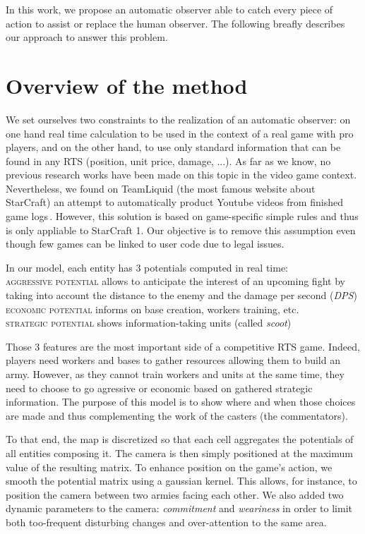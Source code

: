 \documentclass{jfsma}
\begin{document}
    In this work, we propose an automatic observer able to catch every piece of action to assist or replace the human observer. The following breafly describes our approach to answer this problem.

\section{Overview of the method}
We set ourselves two constraints to the realization of an automatic observer: on one hand real time calculation to be used in the context of a real game with pro players, and on the other hand, to use only standard information that can be found in any RTS (position, unit price, damage, ...).
As far as we know, no previous research works have been made on this topic in the video game context.
Nevertheless, we found on TeamLiquid (the most famous website about StarCraft) an attempt to automatically product Youtube videos from finished game logs\,\cite{tl}.
However, this solution is based on game-specific simple rules and thus is only appliable to StarCraft 1.
Our objective is to remove this assumption even though few games can be linked to user code due to legal issues.

In our model, each entity has 3 potentials computed in real time:\\
\textsc{aggressive potential} allows to anticipate the interest of an upcoming fight by taking into account the distance to the enemy and the damage per second (\emph{DPS})\\
\textsc{economic potential} informs on base creation, workers training, etc.\\
\textsc{strategic potential} shows information-taking units (called \emph{scoot})

Those 3 features are the most important side of a competitive RTS game.
Indeed, players need workers and bases to gather resources allowing them to build an army.
However, as they cannot train workers and units at the same time, they need to choose to go agressive or economic based on gathered strategic information.
The purpose of this model is to show where and when those choices are made and thus complementing the work of the casters (the commentators).

To that end, the map is discretized so that each cell aggregates the potentials of all entities composing it.
The camera is then simply positioned at the maximum value of the resulting matrix.
To enhance position on the game's action, we smooth the potential matrix using a gaussian kernel.
This allows, for instance, to position the camera between two armies facing each other.
We also added two dynamic parameters to the camera: \emph{commitment} and \emph{weariness} in order to limit both too-frequent disturbing changes and over-attention to the same area.
\end{document}

